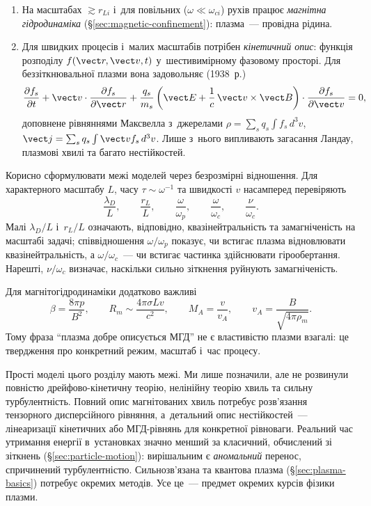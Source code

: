 \begin{enumerate}
	\item На масштабах $\gtrsim r_{Li}$ і~для повільних ($\omega\ll\omega_{ci}$) рухів
	  працює \emph{магнітна гідродинаміка} (§\ref{sec:magnetic-confinement}): плазма~---
	  провідна рідина.
	\item Для швидких процесів і~малих масштабів потрібен \emph{кінетичний опис}: функція
	  розподілу $f(\vect r,\vect v,t)$ у~шестивимірному фазовому просторі. Для
	  беззіткнювальної плазми вона задовольняє  (1938~р.)
	\begin{equation*}
		\frac{\partial f_s}{\partial t}+\vect v\cdot\frac{\partial f_s}{\partial\vect r}+\frac{q_s}{m_s}\left(\vect E+\frac1c\,\vect v\times\vect B\right)\cdot\frac{\partial f_s}{\partial\vect v}=0,
	\end{equation*}
	доповнене рівняннями Максвелла з~джерелами $\rho=\sum_sq_s\int f_s\,d^3v$, $\vect
	j=\sum_sq_s\int\vect v f_s\,d^3v$. Лише з~нього випливають загасання Ландау, плазмові
	хвилі та багато нестійкостей.
\end{enumerate}

Корисно сформулювати межі моделей через безрозмірні відношення. Для характерного масштабу
$L$, часу $\tau\sim\omega^{-1}$ та швидкості $v$ насамперед перевіряють
\begin{equation*}
\frac{\lambda_D}{L},\qquad
\frac{r_L}{L},\qquad
\frac{\omega}{\omega_p},\qquad
\frac{\omega}{\omega_c},\qquad
\frac{\nu}{\omega_c}.
\end{equation*}
Малі $\lambda_D/L$ і~$r_L/L$ означають, відповідно, квазінейтральність та замагніченість
на масштабі задачі; співвідношення $\omega/\omega_p$ показує, чи встигає плазма
відновлювати квазінейтральність, а $\omega/\omega_c$~--- чи встигає частинка здійснювати
гірообертання. Нарешті, $\nu/\omega_c$ визначає, наскільки сильно зіткнення руйнують
замагніченість.

Для магнітогідродинаміки додатково важливі
\begin{equation*}
\beta=\frac{8\pi p}{B^2},
\qquad
R_m\sim\frac{4\pi\sigma Lv}{c^2},
\qquad
M_A=\frac{v}{v_A},
\qquad
v_A=\frac{B}{\sqrt{4\pi\rho_m}}.
\end{equation*}
Тому фраза \enquote{плазма добре описується МГД} не є властивістю плазми взагалі: це
твердження про конкретний режим, масштаб і~час процесу.

Прості моделі цього розділу мають межі. Ми лише позначили, але не розвинули повністю
дрейфово-кінетичну теорію, нелінійну теорію хвиль та сильну турбулентність. Повний опис
магнітованих хвиль потребує розв'язання тензорного дисперсійного рівняння, а~детальний
опис нестійкостей~--- лінеаризації кінетичних або МГД-рівнянь для конкретної рівноваги.
Реальний час утримання енергії в~установках значно менший за класичний, обчислений зі
зіткнень (§\ref{sec:particle-motion}): вирішальним є \emph{аномальний} перенос,
спричинений турбулентністю. Сильнозв'язана та квантова плазма (§\ref{sec:plasma-basics})
потребує окремих методів. Усе це~--- предмет окремих курсів фізики плазми.



